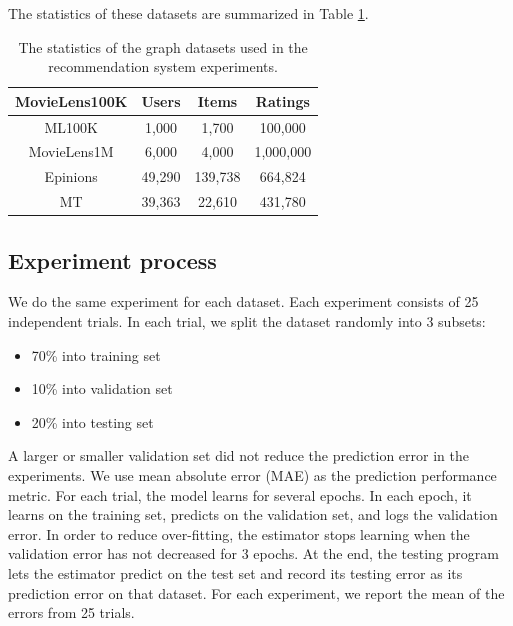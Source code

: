 \documentclass[12pt]{WSUThesis}
\theoremstyle{definition}
\begin{document}
The statistics of these datasets are summarized in Table \ref{tab:datasets-recommendation}.
\begin{table}[!ht]\centering
	\caption{
		The statistics of the graph datasets used in the recommendation system experiments.
	}
	\begin{tabular}{cccc}  \hline
		MovieLens100K & Users   & Items   & Ratings \\ \hline
		ML100K  & 1,000   & 1,700   & 100,000 \\ \hline
		MovieLens1M    & 6,000   & 4,000   & 1,000,000 \\ \hline
		Epinions      & 49,290  & 139,738 & 664,824 \\ \hline
		MT      & 39,363  & 22,610  & 431,780 \\ \hline
	\end{tabular}
	\label{tab:datasets-recommendation}
\end{table}

\subsection{Experiment process}
We do the same experiment for each dataset.
Each experiment consists of 25 independent trials.
In each trial, we split the dataset randomly into 3 subsets:
\begin{itemize}
	\item 70\% into training set
	\item 10\% into validation set
	\item 20\% into testing set
\end{itemize}
A larger or smaller validation set did not reduce the prediction error in the 
experiments.
We use mean absolute error (MAE) as the prediction performance metric.
For each trial, the model learns for several epochs.
In each epoch,
it learns on the training set,
predicts on the validation set,
and logs the validation error.
In order to reduce over-fitting,
the estimator stops learning when the validation error has not decreased for 3 
epochs.
At the end, the testing program lets the estimator predict on the test set 
and record its testing error as its prediction error on that dataset.
For each experiment, we report the mean of the errors from 25 trials.
\end{document}
